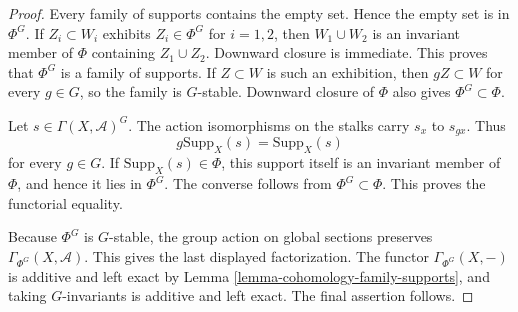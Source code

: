 \begin{proof}
Every family of supports contains the empty set. Hence the empty set is in
$\Phi^G$. If $Z_i\subset W_i$ exhibits $Z_i\in\Phi^G$ for $i=1,2$, then
$W_1\cup W_2$ is an invariant member of $\Phi$ containing
$Z_1\cup Z_2$. Downward closure is immediate. This proves that $\Phi^G$
is a family of supports. If $Z\subset W$ is such an exhibition, then
$gZ\subset W$ for every $g\in G$, so the family is $G$-stable. Downward
closure of $\Phi$ also gives $\Phi^G\subset\Phi$.

Let $s\in\Gamma(X,\mathcal A)^G$. The action isomorphisms on the stalks
carry $s_x$ to $s_{gx}$. Thus
$$
g\text{Supp}_X(s)=\text{Supp}_X(s)
$$
for every $g\in G$. If $\text{Supp}_X(s)\in\Phi$, this support itself is
an invariant member of $\Phi$, and hence it lies in $\Phi^G$. The converse
follows from $\Phi^G\subset\Phi$. This proves the functorial equality.

Because $\Phi^G$ is $G$-stable, the group action on global sections
preserves $\Gamma_{\Phi^G}(X,\mathcal A)$. This gives the last displayed
factorization. The functor $\Gamma_{\Phi^G}(X,-)$ is additive and left
exact by Lemma \ref{lemma-cohomology-family-supports}, and taking
$G$-invariants is additive and left exact. The final assertion follows.
\end{proof}


